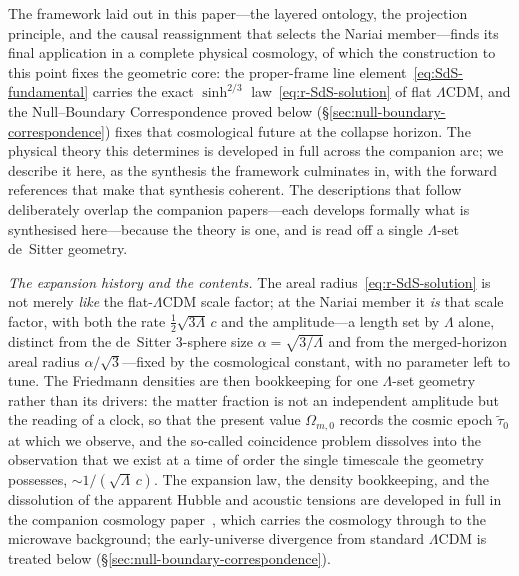 \documentclass[11pt,a4paper]{article}
\theoremstyle{plain}
\theoremstyle{definition}
\theoremstyle{remark}
\begin{document}
The framework laid out in this paper---the layered ontology, the projection principle, and the causal reassignment that selects the Nariai member---finds its final application in a complete physical cosmology, of which the construction to this point fixes the geometric core: the proper-frame line element~\eqref{eq:SdS-fundamental} carries the exact $\sinh^{2/3}$ law~\eqref{eq:r-SdS-solution} of flat $\Lambda$CDM, and the Null--Boundary Correspondence proved below (\S\ref{sec:null-boundary-correspondence}) fixes that cosmological future at the collapse horizon. The physical theory this determines is developed in full across the companion arc; we describe it here, as the synthesis the framework culminates in, with the forward references that make that synthesis coherent. The descriptions that follow deliberately overlap the companion papers---each develops formally what is synthesised here---because the theory is one, and is read off a single $\Lambda$-set de~Sitter geometry.

\emph{The expansion history and the contents.} The areal radius~\eqref{eq:r-SdS-solution} is not merely \emph{like} the flat-$\Lambda$CDM scale factor; at the Nariai member it \emph{is} that scale factor, with both the rate $\tfrac12\sqrt{3\Lambda}\,c$ and the amplitude---a length set by $\Lambda$ alone, distinct from the de~Sitter $3$-sphere size $\alpha=\sqrt{3/\Lambda}$ and from the merged-horizon areal radius $\alpha/\sqrt3$---fixed by the cosmological constant, with no parameter left to tune. The Friedmann densities are then bookkeeping for one $\Lambda$-set geometry rather than its drivers: the matter fraction is not an independent amplitude but the reading of a clock, so that the present value $\Omega_{m,0}$ records the cosmic epoch $\tilde\tau_0$ at which we observe, and the so-called coincidence problem dissolves into the observation that we exist at a time of order the single timescale the geometry possesses, $\sim\!1/(\sqrt\Lambda\,c)$. The expansion law, the density bookkeeping, and the dissolution of the apparent Hubble and acoustic tensions are developed in full in the companion cosmology paper~\cite{JanzenCRcosmology}, which carries the cosmology through to the microwave background; the early-universe divergence from standard $\Lambda$CDM is treated below (\S\ref{sec:null-boundary-correspondence}).
\end{document}
